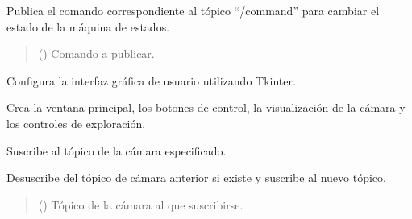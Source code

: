 \documentclass[a4paper,10pt,spanish]{sphinxmanual}
\begin{document}
\begin{fulllineitems}
\begin{fulllineitems}
\sphinxAtStartPar
Publica el comando correspondiente al tópico “/command” para cambiar el estado
de la máquina de estados.
\begin{quote}\begin{description}
\sphinxAtStartPar
{} () \textendash{} Comando a publicar.

\end{description}\end{quote}

\end{fulllineitems}


\begin{fulllineitems}
\label{\detokenize{squad_state_manager:squad_state_manager.InterfazManager.setup_gui}}
\pysigstartsignatures
{}
\pysigstopsignatures
\sphinxAtStartPar
Configura la interfaz gráfica de usuario utilizando Tkinter.

\sphinxAtStartPar
Crea la ventana principal, los botones de control, la visualización de la cámara
y los controles de exploración.

\end{fulllineitems}


\begin{fulllineitems}
\label{\detokenize{squad_state_manager:squad_state_manager.InterfazManager.subscribe_to_camera}}
\pysigstartsignatures
{}
\pysigstopsignatures
\sphinxAtStartPar
Suscribe al tópico de la cámara especificado.

\sphinxAtStartPar
Desuscribe del tópico de cámara anterior si existe y suscribe al nuevo tópico.
\begin{quote}\begin{description}
\sphinxAtStartPar
{} () \textendash{} Tópico de la cámara al que suscribirse.


\end{description}
\end{quote}
\end{fulllineitems}
\end{fulllineitems}
\end{document}

